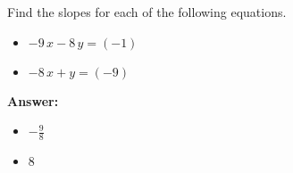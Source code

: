  Find the slopes for each of the following equations. \begin{itemize}\item \( -9 \, x - 8 \, y = \left(-1\right) \)\item \( -8 \, x + y = \left(-9\right) \)\end{itemize}

        \textbf{Answer:} \begin{itemize}\item \( -\frac{9}{8} \)\item \( 8 \)\end{itemize}
